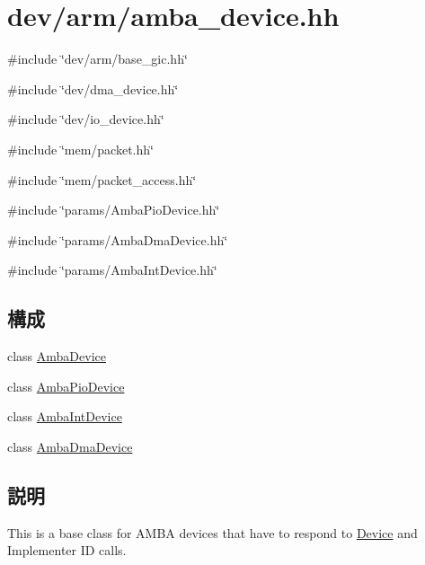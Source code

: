 \hypertarget{amba__device_8hh}{
\section{dev/arm/amba\_\-device.hh}
\label{amba__device_8hh}
}
{\ttfamily \#include \char`\"{}dev/arm/base\_\-gic.hh\char`\"{}}\par
{\ttfamily \#include \char`\"{}dev/dma\_\-device.hh\char`\"{}}\par
{\ttfamily \#include \char`\"{}dev/io\_\-device.hh\char`\"{}}\par
{\ttfamily \#include \char`\"{}mem/packet.hh\char`\"{}}\par
{\ttfamily \#include \char`\"{}mem/packet\_\-access.hh\char`\"{}}\par
{\ttfamily \#include \char`\"{}params/AmbaPioDevice.hh\char`\"{}}\par
{\ttfamily \#include \char`\"{}params/AmbaDmaDevice.hh\char`\"{}}\par
{\ttfamily \#include \char`\"{}params/AmbaIntDevice.hh\char`\"{}}\par
\subsection*{構成}
\begin{DoxyCompactItemize}
\item 
class \hyperlink{classAmbaDevice}{AmbaDevice}
\item 
class \hyperlink{classAmbaPioDevice}{AmbaPioDevice}
\item 
class \hyperlink{classAmbaIntDevice}{AmbaIntDevice}
\item 
class \hyperlink{classAmbaDmaDevice}{AmbaDmaDevice}
\end{DoxyCompactItemize}


\subsection{説明}
This is a base class for AMBA devices that have to respond to \hyperlink{namespaceDevice}{Device} and Implementer ID calls. 